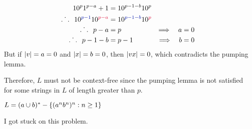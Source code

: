 \begin{problem}
\begin{enumalph}
\begin{Answer}
\begin{enumroman}
\begin{itemize}
\begin{itemize}
                    \begin{align*}
                      10^p1^{p-a} + 1 &= 10^{p-1-b}10^p \\
                      \Therefore 10^{\zaff{p-1}}10^{\crim{p - a}} &= 10^{\zaff{p-1-b}}10^{\crim{p}}\\
                      \Therefore p - a &= p &\Longrightarrow \quad a = 0 \\
                      \Therefore p - 1 - b &= p - 1 &\Longrightarrow  \quad b = 0
                    \end{align*}
                    But if $\lvert v\rvert = a = 0$ and $\lvert x\rvert = b = 0$, then
                    $\lvert vx\rvert = 0$, which contradicts the pumping lemma.
                \end{itemize}
            \end{itemize}

            \step
            Therefore, $L$ must not be context-free since the pumping lemma is not 
            satisfied for some strings in $L$ of length greater than $p$.
        \end{enumroman}

      \end{Answer}
    \item $L = (a \cup b)^* - \left\{(a^n b^n)^n : n \geq 1\right\}$
    \begin{Answer}
      I got stuck on this problem.
    \end{Answer}
  \end{enumalph}
\end{problem}
